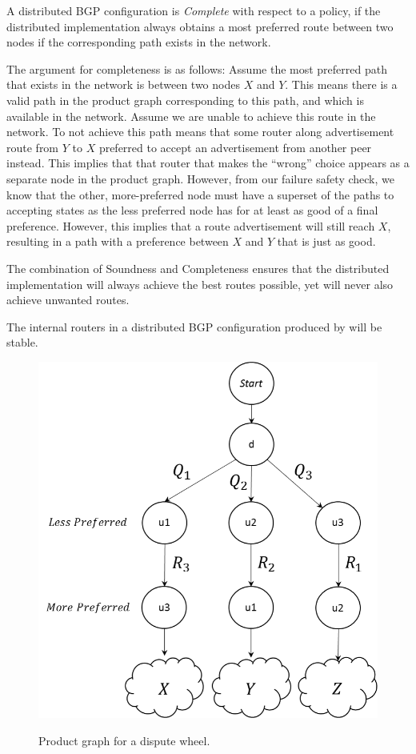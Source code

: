 \begin{defn}
A distributed BGP configuration is \textit{Complete} with respect to a \sysname policy, if the distributed implementation always obtains a most preferred route between two nodes if the corresponding path exists in the network.
\end{defn}

The argument for completeness is as follows: Assume the most preferred path that exists in the network is between two nodes $X$ and $Y$.  This means there is a valid path in the product graph corresponding to this path, and which is available in the network. 
Assume we are unable to achieve this route in the network. To not achieve this path means that some router along advertisement route from $Y$ to $X$ preferred to accept an advertisement from another peer instead. This implies that that router that makes the ``wrong'' choice appears as a separate node in the product graph. However, from our failure safety check, we know that the other, more-preferred node must have a superset of the paths to accepting states as the less preferred node has for at least as good of a final preference. However, this implies that a route advertisement will still reach $X$, resulting in a path with a preference between $X$ and $Y$ that is just as good.

The combination of Soundness and Completeness ensures that the distributed implementation will always achieve the best routes possible, yet will never also achieve unwanted routes. 

\begin{defn}
The internal routers in a distributed BGP configuration produced by \sysname will be stable. 
\end{defn}

\begin{figure}[t!]
\includegraphics[width=\columnwidth]{figures/dispute-wheel}
\label{fig:dispute-wheel}
\caption{Product graph for a dispute wheel.}
\end{figure}

